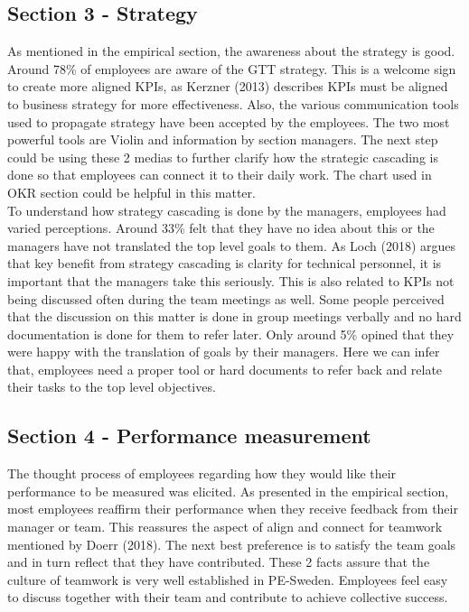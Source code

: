\subsection{Section 3 - Strategy}
As mentioned in the empirical section, the awareness about the strategy is good. Around 78\% of employees are aware of the GTT strategy. This is a welcome sign to create more aligned KPIs, as Kerzner (2013) describes KPIs must be aligned to business strategy for more effectiveness. Also, the various communication tools used to propagate strategy have been accepted by the employees. The two most powerful tools are Violin and information by section managers. The next step could be using these 2 medias to further clarify how the strategic cascading is done so that employees can connect it to their daily work. The chart used in OKR section could be helpful in this matter.\\

To understand how strategy cascading is done by the managers, employees had varied perceptions. Around 33\% felt that they have no idea about this or the managers have not translated the top level goals to them. As Loch (2018) argues that key benefit from strategy cascading is clarity for technical personnel, it is important that the managers take this seriously. This is also related to KPIs not being discussed often during the team meetings as well. Some people perceived that the discussion on this matter is done in group meetings verbally and no hard documentation is done for them to refer later. Only around 5\% opined that they were happy with the translation of goals by their managers. Here we can infer that, employees need a proper tool or hard documents to refer back and relate their tasks to the top level objectives.\\

\subsection{Section 4 - Performance measurement}
The thought process of employees regarding how they would like their performance to be measured was elicited. As presented in the empirical section, most employees reaffirm their performance when they receive feedback from their manager or team. This reassures the aspect of align and connect for teamwork mentioned by Doerr (2018). The next best preference is to satisfy the team goals and in turn reflect that they have contributed. These 2 facts assure that the culture of teamwork is very well established in PE-Sweden. Employees feel easy to discuss together with their team and contribute to achieve collective success. \\

